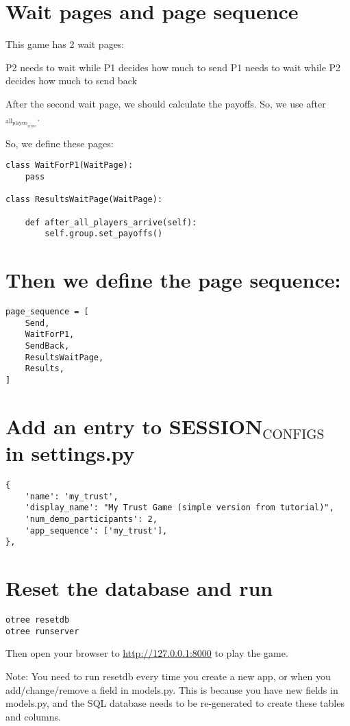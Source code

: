 \documentclass[11pt]{article}
\begin{document}
\section{Wait pages and page sequence}
\label{sec:orgheadline9}

This game has 2 wait pages:

P2 needs to wait while P1 decides how much to send
P1 needs to wait while P2 decides how much to send back

After the second wait page, we should calculate the payoffs. So, we use after\(_{\text{all}}_{\text{players}}_{\text{arrive}}\).

So, we define these pages:

\begin{verbatim}
class WaitForP1(WaitPage):
    pass

class ResultsWaitPage(WaitPage):

    def after_all_players_arrive(self):
        self.group.set_payoffs()
\end{verbatim}

\section{Then we define the page sequence:}
\label{sec:orgheadline10}
\begin{verbatim}
page_sequence = [
    Send,
    WaitForP1,
    SendBack,
    ResultsWaitPage,
    Results,
]
\end{verbatim}

\section{Add an entry to SESSION\(_{\text{CONFIGS}}\) in settings.py}
\label{sec:orgheadline11}

\begin{verbatim}
{
    'name': 'my_trust',
    'display_name': "My Trust Game (simple version from tutorial)",
    'num_demo_participants': 2,
    'app_sequence': ['my_trust'],
},
\end{verbatim}

\section{Reset the database and run}
\label{sec:orgheadline12}

\begin{verbatim}
otree resetdb
otree runserver
\end{verbatim}

Then open your browser to \url{http://127.0.0.1:8000} to play the game.

Note: You need to run resetdb every time you create a new app, or when you add/change/remove a field in models.py. This is because you have new fields in models.py, and the SQL database needs to be re-generated to create these tables and columns.
\end{document}
